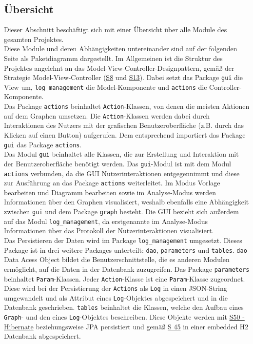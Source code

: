 \documentclass[enabledeprecatedfontcommands,fontsize=11pt,paper=a4,twoside]{scrartcl}
\newcounter{one}
\begin{document}
	\newpage
	
	\subsection{Übersicht}
	Dieser Abschnitt beschäftigt sich mit einer Übersicht über alle Module des gesamten Projektes. \\
	Diese Module und deren Abhängigkeiten untereinander sind auf der folgenden Seite als Paketdiagramm dargestellt.
	Im Allgemeinen ist die Struktur des Projektes angelehnt an das Model-View-Controller-Designpattern, gemäß der Strategie Model-View-Controller (\glqq\hyperlink{bbb}{S8}\grqq{} und \glqq\hyperlink{modelviewcontroller}{S13}\grqq). Dabei setzt das Package \texttt{gui} die View um, \texttt{log\_management} die Model-Komponente und \texttt{actions} die Controller-Komponente. \\
	
	Das Package \texttt{actions} beinhaltet \texttt{Action}-Klassen, von denen die meisten Aktionen auf dem Graphen umsetzen. Die \texttt{Action}-Klassen werden dabei durch Interaktionen des Nutzers mit der grafischen Benutzeroberfläche (z.B. durch das Klicken auf einen Button) aufgerufen. Dem entsprechend importiert das Package \texttt{gui} das Package \texttt{actions}. \\
	
	Das Modul \texttt{gui} beinhaltet alle Klassen, die zur Erstellung und Interaktion mit der Benutzeroberfläche benötigt werden. Das \texttt{gui}-Modul ist mit dem Modul \texttt{actions} verbunden, da die GUI Nutzerinteraktionen entgegennimmt und diese zur Ausführung an das Package \texttt{actions} weiterleitet. Im Modus \glqq Vorlage bearbeiten\grqq{} und \glqq Diagramm bearbeiten\grqq{} sowie im \glqq Analyse\grqq-Modus werden Informationen über den Graphen visualisiert, weshalb ebenfalls eine Abhängigkeit zwischen \texttt{gui} und dem Package \texttt{graph} besteht. Die GUI bezieht sich außerdem auf das Modul \texttt{log\_management}, da erstgenannte im \glqq Analyse\grqq{}-Modus Informationen über das Protokoll der Nutzerinteraktionen visualisiert. \\
	
	Das Persistieren der Daten wird im Package \texttt{log\_management} umgesetzt. Dieses Package ist in drei weitere Packages unterteilt: \texttt{dao}, \texttt{parameters} und \texttt{tables}. \texttt{dao} \glqq Data Acess Object\grqq{} bildet die Benutzerschnittstelle, die es anderen Modulen ermöglicht, auf die Daten in der Datenbank zuzugreifen. Das Package \texttt{parameters} beinhaltet \texttt{Param}-Klassen. Jeder \texttt{Action}-Klasse ist eine \texttt{Param}-Klasse zugeordnet. Diese wird bei der Persistierung der \texttt{Actions} als \texttt{Log} in einen JSON-String umgewandelt und als Attribut eines \texttt{Log}-Objektes abgespeichert und in die Datenbank geschrieben. \texttt{tables} beinhaltet die Klassen, welche den Aufbau eines \texttt{Graph}- und den eines \texttt{Log}-Objektes beschreiben. Diese Objekte werden mit \hyperlink{rrr}{S50 - Hibernate} beziehungsweise JPA persistiert und gemäß \hyperlink{ppp}{S 45} in einer embedded H2 Datenbank abgespeichert. \\ 
	
\end{document}
